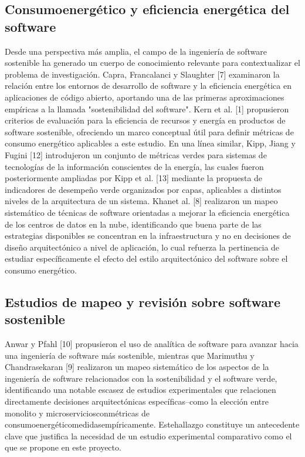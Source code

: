\subsection{Consumoenergético y eficiencia energética del software}
Desde una perspectiva más amplia, el campo de la ingeniería de software sostenible ha generado un cuerpo de conocimiento relevante para contextualizar el problema de investigación. Capra, Francalanci y Slaughter [7] examinaron la relación entre los entornos de desarrollo de software y la eficiencia energética en aplicaciones de código abierto, aportando una de las primeras aproximaciones empíricas a la llamada "sostenibilidad del software". Kern et al. [1] propusieron criterios de evaluación para la eficiencia de recursos y energía en productos de software sostenible, ofreciendo un marco conceptual útil para definir métricas de consumo energético aplicables a este estudio. En una línea similar, Kipp, Jiang y Fugini [12] introdujeron un conjunto de métricas verdes para sistemas de tecnologías de la información conscientes de la energía, las cuales fueron posteriormente ampliadas por Kipp et al. [13] mediante la propuesta de indicadores de desempeño verde organizados por capas, aplicables a distintos niveles de la arquitectura de un sistema. Khanet al. [8] realizaron un mapeo sistemático de técnicas de software orientadas a mejorar la eficiencia energética de los centros de datos en la nube, identificando que buena parte de las estrategias disponibles se concentran en la infraestructura y no en decisiones de diseño arquitectónico a nivel de aplicación, lo cual refuerza la pertinencia de estudiar específicamente el efecto del estilo arquitectónico del software sobre el consumo energético. 

\subsection{Estudios de mapeo y revisión sobre software sostenible}
Anwar y Pfahl [10] propusieron el uso de analítica de software para avanzar hacia una ingeniería de software más sostenible, mientras que Marimuthu y Chandrasekaran [9] realizaron un mapeo sistemático de los aspectos de la ingeniería de software relacionados con la sostenibilidad y el software verde, identificando una notable escasez de estudios experimentales que relacionen directamente decisiones arquitectónicas específicas–como la elección entre monolito y microserviciosconmétricas de consumoenergéticomedidasempíricamente. Estehallazgo constituye un antecedente clave que justifica la necesidad de un estudio experimental comparativo como el que se propone en este proyecto.

